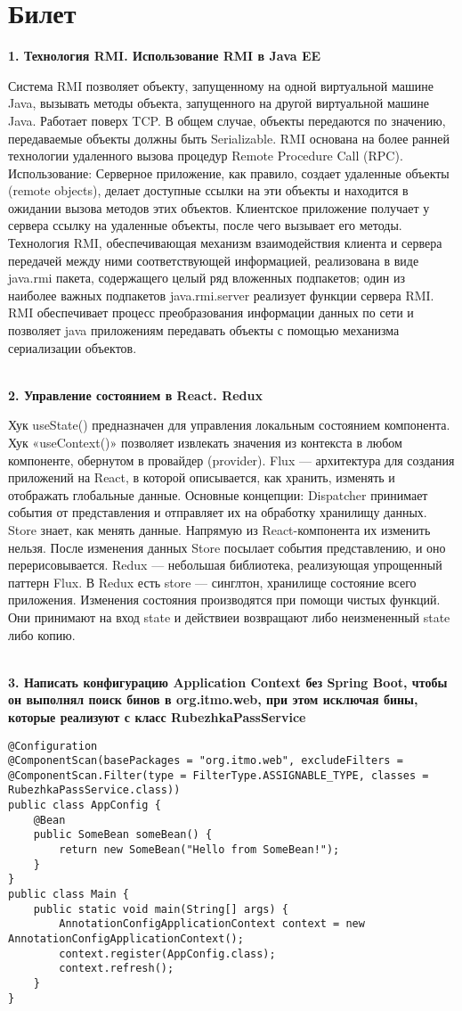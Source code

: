 \documentclass{article}
\newcommand{\bil}[5]{%
        \section{Билет}
        \textbf{1. #1}

        #4
        \\
        \textbf{2. #2}
        
        #5
        \\
        \textbf{3. #3}
}
\begin{document}
\bil{Технология RMI. Использование RMI в Java EE}{Управление состоянием в React. Redux}{Написать конфигурацию Application Context  без Spring  Boot, чтобы он выполнял поиск бинов в  org.itmo.web, при этом исключая бины, которые реализуют с класс RubezhkaPassService}{
    Система RMI позволяет объекту, запущенному на одной виртуальной машине Java, вызывать методы объекта, 
    запущенного на другой виртуальной машине Java. Работает поверх TCP. В общем случае, объекты передаются 
    по значению, передаваемые объекты должны быть Serializable. RMI основана на более ранней технологии 
    удаленного вызова процедур Remote Procedure Call (RPC). Использование: Серверное приложение, как правило, 
    создает удаленные объекты (remote objects), делает доступные ссылки на эти объекты и находится в ожидании 
    вызова методов этих объектов. Клиентское приложение получает у сервера ссылку на удаленные объекты, после 
    чего вызывает его методы. Технология RMI, обеспечивающая механизм взаимодействия клиента и сервера передачей 
    между ними соответствующей информацией, реализована в виде java.rmi пакета, содержащего целый ряд вложенных 
    подпакетов; один из наиболее важных подпакетов java.rmi.server реализует функции сервера RMI. RMI обеспечивает 
    процесс преобразования информации данных по сети и позволяет java приложениям передавать объекты с помощью 
    механизма сериализации объектов.
}{
    Хук useState() предназначен для управления локальным состоянием компонента. 
    Хук «useContext()» позволяет извлекать значения из контекста в любом компоненте, 
    обернутом в провайдер (provider). Flux — архитектура для создания приложений на React, 
    в которой описывается, как хранить, изменять и отображать глобальные данные. 
    Основные концепции: Dispatcher принимает события от представления и отправляет их на обработку хранилищу данных. 
    Store знает, как менять данные. Напрямую из React-компонента их изменить нельзя. 
    После изменения данных Store посылает события представлению, и оно перерисовывается. 
    Redux — небольшая библиотека, реализующая упрощенный паттерн Flux. 
    В Redux есть store — синглтон, хранилище состояние всего приложения. 
    Изменения состояния производятся при помощи чистых функций. 
    Они принимают на вход state и действиеи возвращают либо неизмененный state либо копию.
}
\begin{lstlisting}[frame=single, basicstyle=\ttfamily, breaklines=true, breakatwhitespace=true, postbreak=\mbox{\textcolor{red}{$\hookrightarrow$}\space}]
@Configuration
@ComponentScan(basePackages = "org.itmo.web", excludeFilters = @ComponentScan.Filter(type = FilterType.ASSIGNABLE_TYPE, classes = RubezhkaPassService.class))
public class AppConfig {
    @Bean
    public SomeBean someBean() {
        return new SomeBean("Hello from SomeBean!");
    }
}
public class Main {
    public static void main(String[] args) {
        AnnotationConfigApplicationContext context = new AnnotationConfigApplicationContext();
        context.register(AppConfig.class);
        context.refresh();
    }
}
    
\end{lstlisting}
\end{document}
